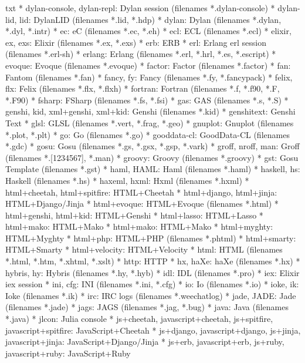 \documentclass[11pt,oneside]{book}
\begin{document}
\begin{common-format}
\begin{xverbatim}{txt}
* dylan-console, dylan-repl:
    Dylan session (filenames *.dylan-console)
* dylan-lid, lid:
    DylanLID (filenames *.lid, *.hdp)
* dylan:
    Dylan (filenames *.dylan, *.dyl, *.intr)
* ec:
    eC (filenames *.ec, *.eh)
* ecl:
    ECL (filenames *.ecl)
* elixir, ex, exs:
    Elixir (filenames *.ex, *.exs)
* erb:
    ERB 
* erl:
    Erlang erl session (filenames *.erl-sh)
* erlang:
    Erlang (filenames *.erl, *.hrl, *.es, *.escript)
* evoque:
    Evoque (filenames *.evoque)
* factor:
    Factor (filenames *.factor)
* fan:
    Fantom (filenames *.fan)
* fancy, fy:
    Fancy (filenames *.fy, *.fancypack)
* felix, flx:
    Felix (filenames *.flx, *.flxh)
* fortran:
    Fortran (filenames *.f, *.f90, *.F, *.F90)
* fsharp:
    FSharp (filenames *.fs, *.fsi)
* gas:
    GAS (filenames *.s, *.S)
* genshi, kid, xml+genshi, xml+kid:
    Genshi (filenames *.kid)
* genshitext:
    Genshi Text 
* glsl:
    GLSL (filenames *.vert, *.frag, *.geo)
* gnuplot:
    Gnuplot (filenames *.plot, *.plt)
* go:
    Go (filenames *.go)
* gooddata-cl:
    GoodData-CL (filenames *.gdc)
* gosu:
    Gosu (filenames *.gs, *.gsx, *.gsp, *.vark)
* groff, nroff, man:
    Groff (filenames *.[1234567], *.man)
* groovy:
    Groovy (filenames *.groovy)
* gst:
    Gosu Template (filenames *.gst)
* haml, HAML:
    Haml (filenames *.haml)
* haskell, hs:
    Haskell (filenames *.hs)
* haxeml, hxml:
    Hxml (filenames *.hxml)
* html+cheetah, html+spitfire:
    HTML+Cheetah 
* html+django, html+jinja:
    HTML+Django/Jinja 
* html+evoque:
    HTML+Evoque (filenames *.html)
* html+genshi, html+kid:
    HTML+Genshi 
* html+lasso:
    HTML+Lasso 
* html+mako:
    HTML+Mako 
* html+mako:
    HTML+Mako 
* html+myghty:
    HTML+Myghty 
* html+php:
    HTML+PHP (filenames *.phtml)
* html+smarty:
    HTML+Smarty 
* html+velocity:
    HTML+Velocity 
* html:
    HTML (filenames *.html, *.htm, *.xhtml, *.xslt)
* http:
    HTTP 
* hx, haXe:
    haXe (filenames *.hx)
* hybris, hy:
    Hybris (filenames *.hy, *.hyb)
* idl:
    IDL (filenames *.pro)
* iex:
    Elixir iex session 
* ini, cfg:
    INI (filenames *.ini, *.cfg)
* io:
    Io (filenames *.io)
* ioke, ik:
    Ioke (filenames *.ik)
* irc:
    IRC logs (filenames *.weechatlog)
* jade, JADE:
    Jade (filenames *.jade)
* jags:
    JAGS (filenames *.jag, *.bug)
* java:
    Java (filenames *.java)
* jlcon:
    Julia console 
* js+cheetah, javascript+cheetah, js+spitfire, javascript+spitfire:
    JavaScript+Cheetah 
* js+django, javascript+django, js+jinja, javascript+jinja:
    JavaScript+Django/Jinja 
* js+erb, javascript+erb, js+ruby, javascript+ruby:
    JavaScript+Ruby 

\end{xverbatim}
\end{common-format}
\end{document}
